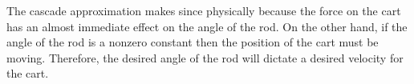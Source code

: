 The cascade approximation makes since physically because the force on the cart has an almost immediate effect on the angle of the rod.  On the other hand, if the angle of the rod is a nonzero constant then the position of the cart must be moving.  Therefore, the desired angle of the rod will dictate a desired velocity for the cart.
